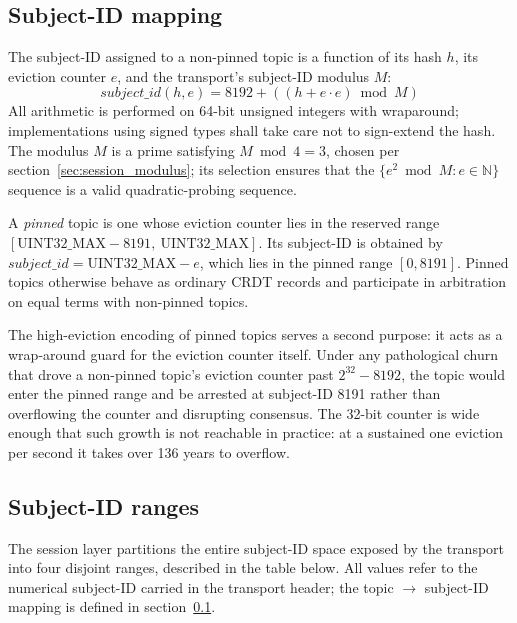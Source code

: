 \subsection{Subject-ID mapping}\label{sec:session_subject_id_mapping}

The subject-ID assigned to a non-pinned topic is a function of its hash $h$, its
eviction counter $e$, and the transport's subject-ID modulus $M$:
\begin{equation*}
    \mathit{subject\_id}(h, e) = 8192 + ((h + e \cdot e) \bmod M)
\end{equation*}
All arithmetic is performed on 64-bit unsigned integers with wraparound;
implementations using signed types shall take care not to sign-extend the hash.
The modulus $M$ is a prime satisfying $M \bmod 4 = 3$, chosen per
section~\ref{sec:session_modulus}; its selection ensures that the
$\{e^2 \bmod M : e \in \mathbb{N}\}$ sequence is a valid quadratic-probing
sequence.

A \emph{pinned} topic is one whose eviction counter lies in the reserved range
$[\text{UINT32\_MAX}-8191,\ \text{UINT32\_MAX}]$.
Its subject-ID is obtained by $\mathit{subject\_id} = \text{UINT32\_MAX} - e$,
which lies in the pinned range $[0, 8191]$.
Pinned topics otherwise behave as ordinary CRDT records and participate in
arbitration on equal terms with non-pinned topics.

\begin{remark}
    The high-eviction encoding of pinned topics serves a second purpose: it acts as a
    wrap-around guard for the eviction counter itself.
    Under any pathological churn that drove a non-pinned topic's eviction counter
    past $2^{32} - 8192$, the topic would enter the pinned range and be arrested at
    subject-ID 8191 rather than overflowing the counter and disrupting consensus.
    The 32-bit counter is wide enough that such growth is not reachable in practice:
    at a sustained one eviction per second it takes over 136 years to overflow.
\end{remark}

\subsection{Subject-ID ranges}\label{sec:session_subject_id_ranges}

The session layer partitions the entire subject-ID space exposed by the
transport into four disjoint ranges, described in the table below.
All values refer to the numerical subject-ID carried in the transport header;
the topic $\to$ subject-ID mapping is defined in
section~\ref{sec:session_subject_id_mapping}.

